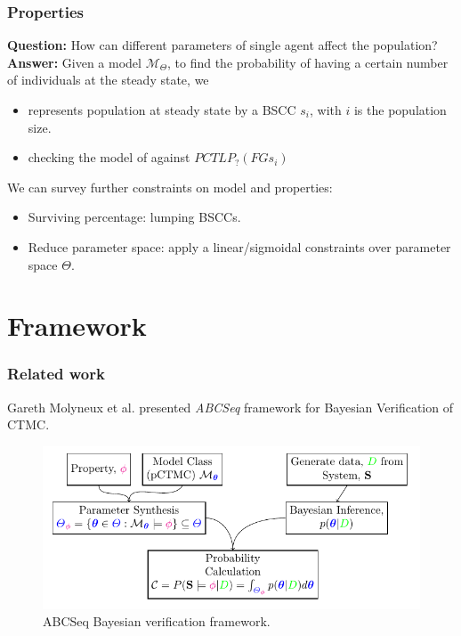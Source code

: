 \documentclass{beamer}
\begin{document}
\begin{frame}
  \frametitle{Properties}
  \textbf{Question:} How can different parameters of single agent affect the
  population?\\
  \textbf{Answer:}
  Given a model $\mathcal{M}_\Theta$, to find the probability of having a
  certain number of individuals at the steady state, we
  \begin{itemize}
    \item represents population at steady state by a BSCC $s_i$, with $i$ is the
          population size.
    \item checking the model of against $PCTL P_{?} (FG s_i)$
  \end{itemize}

  We can survey further constraints on model and properties:
  \begin{itemize}
    \item Surviving percentage: lumping BSCCs.
    \item Reduce parameter space: apply a linear/sigmoidal constraints over
          parameter space $\Theta$.
  \end{itemize}

\end{frame}


\section{Framework}
\begin{frame}
  \frametitle{Related work}
  Gareth Molyneux et al. \cite{molyneux2019bayesian} presented \textit{ABCSeq} framework
  for Bayesian Verification of CTMC.
  \begin{figure}[t]
    \includegraphics[height=0.5\textheight]{molyneux2019.png} \centering
    \caption{ABCSeq Bayesian verification framework.}
  \end{figure}
\end{frame}
\end{document}
